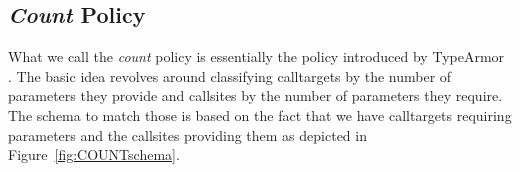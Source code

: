 \subsection{\emph{Count} Policy}
\label{section:countpolicy}
What we call the \emph{count} policy is essentially the policy introduced by TypeArmor \cite{veen:typearmor}. 
The basic idea revolves around classifying calltargets by the number of parameters they provide and callsites 
by the number of parameters they require. The schema to match those is based on the fact that we  
have calltargets requiring parameters and the callsites providing them as depicted in Figure~\ref{fig:COUNTschema}.
%
%
%
%
%
%
%
%
%
%
%
%
%
%
%

